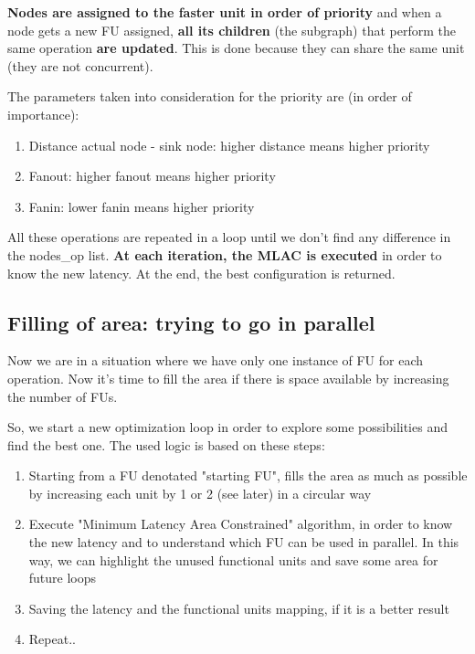 \documentclass{article}
\begin{document}
  \textbf{Nodes are assigned to the faster unit in order of priority} and when a node gets a new FU assigned, \textbf{all its children} (the subgraph) that perform the same operation \textbf{are updated}. This is done because they can share the same unit (they are not concurrent).

  The parameters taken into consideration for the priority are (in order of importance):

  \begin{enumerate}
    \item Distance actual node - sink node: higher distance means higher priority
    \item Fanout: higher fanout means higher priority
    \item Fanin: lower fanin means higher priority
  \end{enumerate}

  All these operations are repeated in a loop until we don't find any difference in the nodes\_op list. \textbf{At each iteration, the MLAC is executed} in order to know the new latency. At the end, the best configuration is returned.


  \subsection{Filling of area: trying to go in parallel}

  Now we are in a situation where we have only one instance of FU for each operation. Now it's time to fill the area if there is space available by increasing the number of FUs.

  So, we start a new optimization loop in order to explore some possibilities and find the best one. The used logic is based on these steps:
  
  \begin{enumerate}
      \item Starting from a FU denotated "starting FU", fills the area as much as possible by increasing each unit by 1 or 2 (see later) in a circular way
      \item Execute "Minimum Latency Area Constrained" algorithm, in order to know the new latency and to understand which FU can be used in parallel. In this way, we can highlight the unused functional units and save some area for future loops
      \item Saving the latency and the functional units mapping, if it is a better result
      \item Repeat..
  \end{enumerate}
\end{document}
